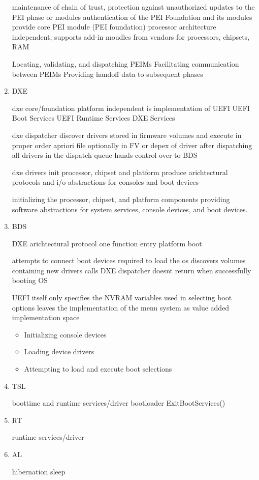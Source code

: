 \begin{enumerate}
    maintenance of chain of trust, protection against unauthorized updates to the PEI phase or modules
    authentication of the PEI Foundation and its modules
    provide core PEI module (PEI foundation) processor architecture independent, supports add-in moudles from vendors for processors, chipsets, RAM

    Locating, validating, and dispatching PEIMs
    Facilitating communication between PEIMs
    Providing handoff data to subsequent phases

    \item{\acf{DXE}}

    dxe core/foundation
    platform independent
    is implementation of UEFI
    UEFI Boot Services
    UEFI Runtime Services
    DXE Services

    dxe dispatcher
    discover drivers stored in firmware volumes and execute in proper order
    apriori file optionally in FV or depex of driver
    after dispatching all drivers in the dispatch queue hands control over to BDS

    dxe drivers
    init processor, chipset and platform
    produce arichtectural protocols and i/o abstractions for consoles and boot devices

    initializing the processor, chipset, and platform components
    providing software abstractions for system services, console devices, and boot devices.

    \item{\acf{BDS}}

    DXE arichtectural protocol
    one function entry
    platform boot

    attempts to connect boot devices required to load the os
    discovers volumes containing new drivers
    calls DXE dispatcher
    doesnt return when successfully booting OS

    UEFI itself only specifies the NVRAM variables used in selecting boot options
    leaves the implementation of the menu system as value added implementation space \cite{uefi-spec}

    \cite{pi-spec}

    \begin{itemize}
        \item Initializing console devices
        \item Loading device drivers
        \item Attempting to load and execute boot selections
    \end{itemize}

    \item{\acf{TSL}}

    boottime and runtime services/driver
    bootloader
    ExitBootServices()

    \item{\acf{RT}}

    runtime services/driver

    \item{\acf{AL}}

    hibernation
    sleep

\end{enumerate}

